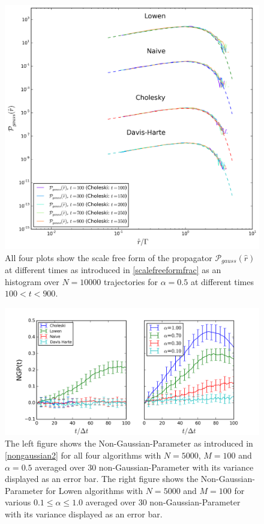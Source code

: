\documentclass[
  a4paper,BCOR10mm,oneside,
  headsepline,footsepline,%
  fleqn,openbib
]{scrbook}
\begin{document}
\begin{figure}[h!]
\centering
\includegraphics[width=\textwidth]{./data/scaledfunctionneu12.png}
\caption{All four plots show the scale free form of the propagator $\mathcal{P}_{gauss}(\hat{r})$ at different times as introduced in \cref{scalefreeformfrac} as an histogram over $N=10000$ trajectories for $\alpha=0.5$ at different times $100<t<900$.}
\label{rescaledfunction}
\end{figure}
\begin{figure}[h]
\centering
\includegraphics[width=\textwidth]{./data/nongaussianlowenalphaneu.png}
\caption{ The left figure shows the Non-Gaussian-Parameter as introduced in \cref{nongaussian2} for all four algorithms with  $N=5000$, $M=100$ and $\alpha=0.5$   averaged over $30$ non-Gaussian-Parameter with its variance displayed as an error bar.\newline
The right figure shows the  Non-Gaussian-Parameter for Lowen algorithms with  $N=5000$ and $M=100$ for various $0.1\leq\alpha\leq1.0$ averaged over $30$ non-Gaussian-Parameter with its variance displayed as an error bar.}
\label{nongaussianlowen}
\end{figure}
\end{document}
